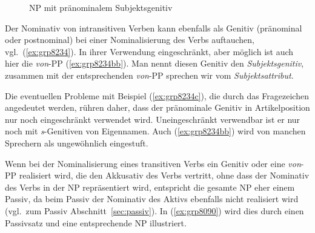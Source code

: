 \begin{figure}[!htbp]
  \centering
  \caption{NP mit pränominalem Subjektsgenitiv}
  \label{fig:grp1940b}
\end{figure}

Der Nominativ von intransitiven Verben kann ebenfalls als Genitiv (pränominal oder postnominal) bei einer Nominalisierung des Verbs auftauchen, vgl.\ (\ref{ex:grp8234}).
In ihrer Verwendung eingeschränkt, aber möglich ist auch hier die \textit{von}-PP (\ref{ex:grp8234bb}).
Man nennt diesen Genitiv den \textit{Subjektsgenitiv}, zusammen mit der entsprechenden \textit{von}-PP sprechen wir vom \textit{Subjektsattribut}.

\begin{exe}
  \ex\label{ex:grp8234}
  \begin{xlist}
  \end{xlist}
\end{exe}

Die eventuellen Probleme mit Beispiel (\ref{ex:grp8234c}), die durch das Fragezeichen angedeutet werden, rühren daher, dass der pränominale Genitiv in Artikelposition nur noch eingeschränkt verwendet wird.
Uneingeschränkt verwendbar ist er nur noch mit \textit{s}-Genitiven von Eigennamen.
Auch (\ref{ex:grp8234bb}) wird von manchen Sprechern als ungewöhnlich eingestuft.

Wenn bei der Nominalisierung eines transitiven Verbs ein Genitiv oder eine \textit{von}-PP realisiert wird, die den Akkusativ des Verbs vertritt, ohne dass der Nominativ des Verbs in der NP repräsentiert wird, entspricht die gesamte NP eher einem Passiv, da beim Passiv der Nominativ des Aktivs ebenfalls nicht realisiert wird (vgl.\ zum Passiv Abschnitt~\ref{sec:passiv}).
In (\ref{ex:grp8090}) wird dies durch einen Passivsatz und eine entsprechende NP illustriert.

